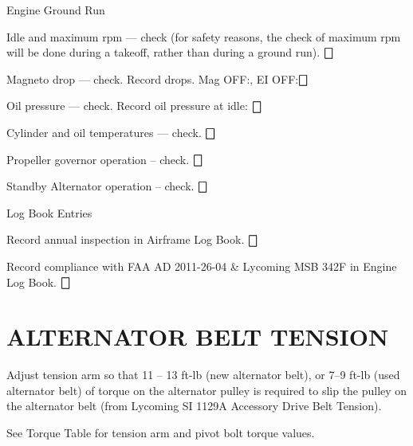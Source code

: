 \begin{enumerate*}
\begin{enumerate*}
	\end{enumerate*}
	\item{Engine Ground Run}
	\begin{enumerate*}
		\item Idle and maximum rpm --- check (for safety reasons, the check of maximum rpm will be done during a takeoff, rather than during a ground run). \dotfill $\bigbox$
		\item Magneto drop --- check. Record drops. Mag OFF:\underline{\makebox[0.5in][l]{}}, EI OFF:\underline{\makebox[0.5in][l]{}}\dotfill $\bigbox$
		\item Oil pressure --- check. Record oil pressure at idle: \underline{\makebox[0.5in][l]{}} \dotfill $\bigbox$
		\item Cylinder and oil temperatures --- check. \dotfill $\bigbox$
		\item Propeller governor operation -- check. \dotfill $\bigbox$
		\item Standby Alternator operation -- check. \dotfill $\bigbox$
	\end{enumerate*}
	\item{Log Book Entries}
	\begin{enumerate*}
		\item Record annual inspection in Airframe Log Book. \dotfill $\bigbox$
		\item Record compliance with FAA AD 2011-26-04 \& Lycoming MSB 342F in Engine Log Book. \dotfill $\bigbox$
	\end{enumerate*}
\end{enumerate*}

\section{ALTERNATOR BELT TENSION} 
\begin{enumerate*}
	\item Adjust tension arm so that 11 -- 13 ft-lb (new alternator belt), or 7--9 ft-lb (used alternator belt) of torque on the alternator pulley is required to slip the pulley on the alternator belt (from Lycoming SI 1129A Accessory Drive Belt Tension). 
	\item See Torque Table for tension arm and pivot bolt torque values. 
\end{enumerate*}

